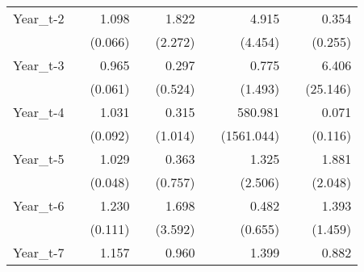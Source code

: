 \begin{table}[htbp]
\begin{tabular}{l*{8}{D{.}{.}{-1}}}
Year\_t-2            &                     &       1.098         &                     &       1.822         &                     &       4.915\sym{*}  &                     &       0.354         \\
                    &                     &     (0.066)         &                     &     (2.272)         &                     &     (4.454)         &                     &     (0.255)         \\
Year\_t-3            &                     &       0.965         &                     &       0.297         &                     &       0.775         &                     &       6.406         \\
                    &                     &     (0.061)         &                     &     (0.524)         &                     &     (1.493)         &                     &    (25.146)         \\
Year\_t-4            &                     &       1.031         &                     &       0.315         &                     &     580.981\sym{**} &                     &       0.071         \\
                    &                     &     (0.092)         &                     &     (1.014)         &                     &  (1561.044)         &                     &     (0.116)         \\
Year\_t-5            &                     &       1.029         &                     &       0.363         &                     &       1.325         &                     &       1.881         \\
                    &                     &     (0.048)         &                     &     (0.757)         &                     &     (2.506)         &                     &     (2.048)         \\
Year\_t-6            &                     &       1.230\sym{**} &                     &       1.698         &                     &       0.482         &                     &       1.393         \\
                    &                     &     (0.111)         &                     &     (3.592)         &                     &     (0.655)         &                     &     (1.459)         \\
Year\_t-7            &                     &       1.157         &                     &       0.960         &                     &       1.399         &                     &       0.882         \\

\end{tabular}
\end{table}
